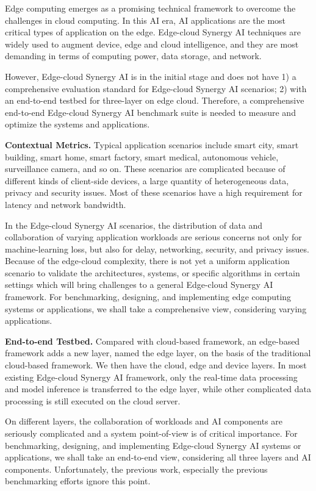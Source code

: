 Edge computing emerges as a promising technical framework to overcome the challenges in cloud computing. In this AI era, AI applications are the most critical types of application on the edge. Edge-cloud Synergy AI techniques are widely used to augment device, edge and cloud intelligence, and they are most demanding in terms of computing power, data storage, and network. 

However, Edge-cloud Synergy AI is in the initial stage and does not have 1) a comprehensive evaluation standard for Edge-cloud Synergy AI scenarios; 2) with an end-to-end testbed for three-layer on edge cloud. Therefore, a comprehensive end-to-end Edge-cloud Synergy AI benchmark suite is needed to measure and optimize the systems and applications.

\textbf{Contextual Metrics.} Typical application scenarios include smart city, smart building, smart home, smart factory, smart medical, autonomous vehicle, surveillance camera, and so on. These scenarios are complicated because of different kinds of client-side devices, a large quantity of heterogeneous data, privacy and security issues. Most of these scenarios have a high requirement for latency and network bandwidth. 

In the Edge-cloud Synergy AI scenarios, the distribution of data and collaboration of varying application workloads are serious concerns not only for machine-learning loss, but also for delay, networking, security, and privacy issues. Because of the edge-cloud complexity, there is not yet a uniform application scenario to validate the architectures, systems, or specific algorithms in certain settings which will bring challenges to a general Edge-cloud Synergy AI framework. For benchmarking, designing, and implementing edge computing systems or applications, we shall take a comprehensive view, considering varying applications.

\textbf{End-to-end Testbed.} Compared with cloud-based framework, an edge-based framework adds a new layer, named the edge layer, on the basis of the traditional cloud-based framework. We then have the cloud, edge and device layers. In most existing Edge-cloud Synergy AI framework, only the real-time data processing and model inference is transferred to the edge layer, while other complicated data processing is still executed on the cloud server.

On different layers, the collaboration of workloads and AI components are seriously complicated and a system point-of-view is of critical importance. For benchmarking, designing, and implementing Edge-cloud Synergy AI systems or applications, we shall take an end-to-end view, considering all three layers and AI components. Unfortunately, the previous work, especially the previous benchmarking efforts ignore this point.

